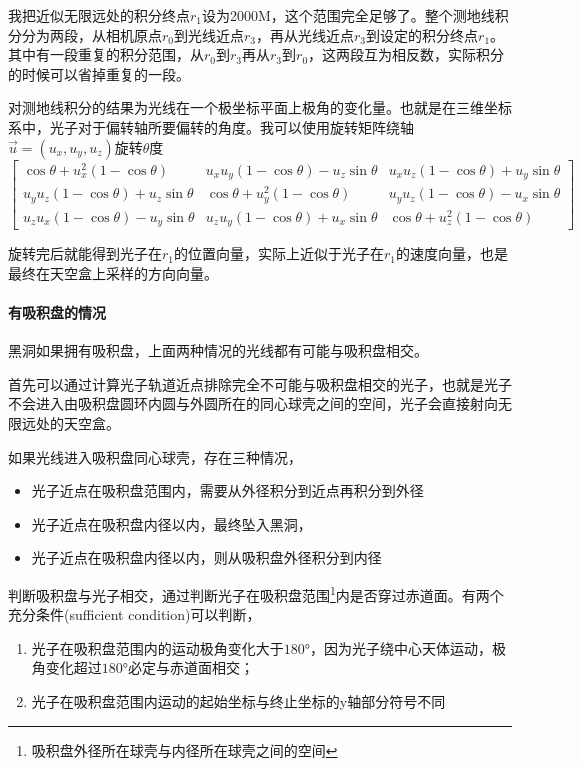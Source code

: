 我把近似无限远处的积分终点$r_1$设为2000M，这个范围完全足够了。整个测地线积分分为两段，从相机原点$r_0$到光线近点$r_3$，再从光线近点$r_3$到设定的积分终点$r_1$。其中有一段重复的积分范围，从$r_0$到$r_3$再从$r_3$到$r_0$，这两段互为相反数，实际积分的时候可以省掉重复的一段。

对测地线积分的结果为光线在一个极坐标平面上极角的变化量。也就是在三维坐标系中，光子对于偏转轴所要偏转的角度。我可以使用旋转矩阵\cite{rotation_matrix}绕轴$\vec{u}=\left(u_x,u_y,u_z\right)$旋转$\theta$度
\begin{equation}
    \begin{bmatrix}\cos\theta+u_{x}^{2}\left(1-\cos\theta\right) & u_{x}u_{y}\left(1-\cos\theta\right)-u_{z}\sin\theta & u_{x}u_{z}\left(1-\cos\theta\right)+u_{y}\sin\theta\\
        u_{y}u_{z}\left(1-\cos\theta\right)+u_{z}\sin\theta & \cos\theta+u_{y}^{2}\left(1-\cos\theta\right) & u_{y}u_{z}\left(1-\cos\theta\right)-u_{x}\sin\theta\\
        u_{z}u_{x}\left(1-\cos\theta\right)-u_{y}\sin\theta & u_{z}u_{y}\left(1-\cos\theta\right)+u_{x}\sin\theta & \cos\theta+u_{z}^{2}\left(1-\cos\theta\right)
        \end{bmatrix}
\end{equation}

旋转完后就能得到光子在$r_1$的位置向量，实际上近似于光子在$r_1$的速度向量，也是最终在天空盒上采样的方向向量。

\paragraph{有吸积盘的情况}
黑洞如果拥有吸积盘，上面两种情况的光线都有可能与吸积盘相交。

首先可以通过计算光子轨道近点排除完全不可能与吸积盘相交的光子，也就是光子不会进入由吸积盘圆环内圆与外圆所在的同心球壳之间的空间，光子会直接射向无限远处的天空盒。

如果光线进入吸积盘同心球壳，存在三种情况，

\begin{itemize}
    \item 光子近点在吸积盘范围内，需要从外径积分到近点再积分到外径
    \item 光子近点在吸积盘内径以内，最终坠入黑洞，
    \item 光子近点在吸积盘内径以内，则从吸积盘外径积分到内径
\end{itemize}

判断吸积盘与光子相交，通过判断光子在吸积盘范围\footnote{\label{accretion_disk_area}吸积盘外径所在球壳与内径所在球壳之间的空间}内是否穿过赤道面。有两个充分条件(sufficient condition)可以判断，
\begin{enumerate}
    \item 光子在吸积盘范围内的运动极角变化大于$\ang{180}$，因为光子绕中心天体运动，极角变化超过$\ang{180}$必定与赤道面相交；
    \item 光子在吸积盘范围内运动的起始坐标与终止坐标的y轴部分符号不同
\end{enumerate}

